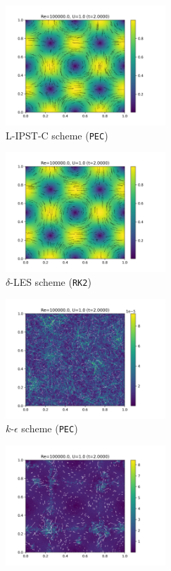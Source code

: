 \begin{figure}[htbp!]
  \begin{subfigure}{7cm}
  \centering\includegraphics[width=6cm]{Code-Figures/long-tgv/c0_20_tait_hdx_2_pec_dtmul_1_sd_n_o_files_50_nx_200_pst_10_re_100000_tsph_wcsph_tf_2/final_vmag.png}
  \caption{L-IPST-C scheme (\texttt{PEC})}
  \end{subfigure}
  \begin{subfigure}{7cm}
  \centering\includegraphics[width=6cm]{Code-Figures/long-tgv/c0_20_tait_hdx_2_rk2_dtmul_1.5_n_o_files_50_nx_200_pst_10_re_100000_deltales_tf_2/final_vmag.png}
  \caption{$\delta$-LES scheme (\texttt{RK2})}
  \end{subfigure}
  \begin{subfigure}{7cm}
  \centering\includegraphics[width=6cm]{Code-Figures/long-tgv/c0_20_tait_hdx_2_pec_dtmul_1_no_n_o_files_50_nx_200_pst_10_re_100000_k_eps_tf_2/final_vmag.png}
  \caption{$k$-$\epsilon$ scheme (\texttt{PEC})}
  \end{subfigure}
  \begin{subfigure}{7cm}
  \centering\includegraphics[width=6cm]{Code-Figures/long-tgv/c0_20_tait_hdx_2_pec_dtmul_1_mon2017_eps_0.5_no_n_o_files_50_nx_200_pst_10_re_100000_mon2017_tf_2/final_vmag.png}

\end{subfigure}
\end{figure}
